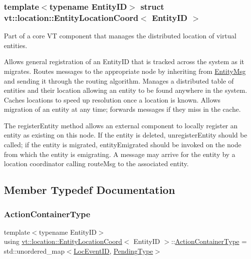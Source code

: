 \subsubsection*{template$<$typename Entity\+ID$>$\newline
struct vt\+::location\+::\+Entity\+Location\+Coord$<$ Entity\+I\+D $>$}

Part of a core VT component that manages the distributed location of virtual entities. 

Allows general registration of an {\ttfamily Entity\+ID} that is tracked across the system as it migrates. Routes messages to the appropriate node by inheriting from {\ttfamily \hyperlink{structvt_1_1location_1_1_entity_msg}{Entity\+Msg}} and sending it through the routing algorithm. Manages a distributed table of entities and their location allowing an entity to be found anywhere in the system. Caches locations to speed up resolution once a location is known. Allows migration of an entity at any time; forwards messages if they miss in the cache.

The {\ttfamily register\+Entity} method allows an external component to locally register an entity as existing on this node. If the entity is deleted, {\ttfamily unregister\+Entity} should be called; if the entity is migrated, {\ttfamily entity\+Emigrated} should be invoked on the node from which the entity is emigrating. A message may arrive for the entity by a location coordinator calling {\ttfamily route\+Msg} to the associated entity. 

\subsection{Member Typedef Documentation}
\mbox{\label{structvt_1_1location_1_1_entity_location_coord_afeaaebfc1d7cbdd20cccbd348d96748a}} 
\subsubsection{\texorpdfstring{Action\+Container\+Type}{ActionContainerType}}
{\footnotesize\ttfamily template$<$typename Entity\+ID$>$ \\
using \hyperlink{structvt_1_1location_1_1_entity_location_coord}{vt\+::location\+::\+Entity\+Location\+Coord}$<$ Entity\+ID $>$\+::\hyperlink{structvt_1_1location_1_1_entity_location_coord_afeaaebfc1d7cbdd20cccbd348d96748a}{Action\+Container\+Type} =  std\+::unordered\+\_\+map$<$\hyperlink{namespacevt_1_1location_aa5ccc1a42aa22b0b41fcfbbdee314dca}{Loc\+Event\+ID}, \hyperlink{structvt_1_1location_1_1_entity_location_coord_a41b5c3792967e089c7e592b705c266c3}{Pending\+Type}$>$}

